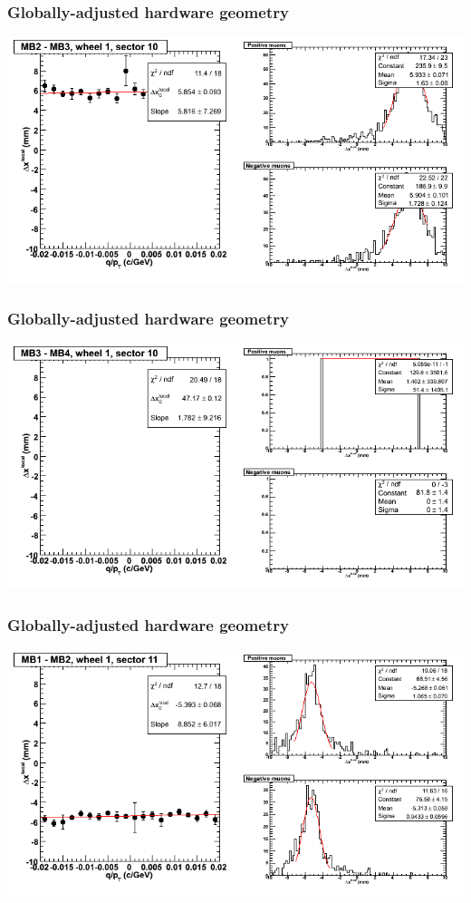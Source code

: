 \documentclass[compress]{beamer}
\begin{document}
\begin{frame}
\frametitle{Globally-adjusted hardware geometry}
\includegraphics[width=\linewidth]{NOV4_segdiffs_HW/dt13_resid_D_10_23.png}
\end{frame}

\begin{frame}
\frametitle{Globally-adjusted hardware geometry}
\includegraphics[width=\linewidth]{NOV4_segdiffs_HW/dt13_resid_D_10_34.png}
\end{frame}

\begin{frame}
\frametitle{Globally-adjusted hardware geometry}
\includegraphics[width=\linewidth]{NOV4_segdiffs_HW/dt13_resid_D_11_12.png}
\end{frame}
\end{document}
